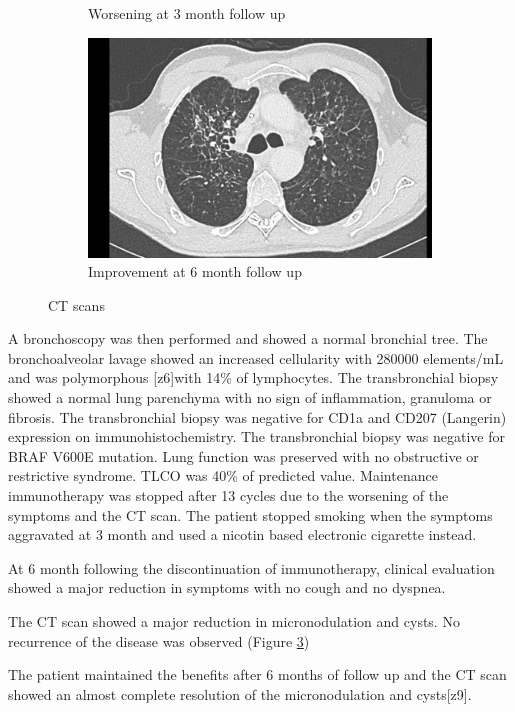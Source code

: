 \documentclass{article}
\begin{document}
\begin{figure}[ht]
\begin{subfigure}[t]{0.45\linewidth}
    \caption{Worsening at 3 month follow up}
    \label{fig:scan3}
  \end{subfigure}
  \begin{subfigure}[t]{0.45\linewidth}
    \includegraphics[width=\linewidth]{scan-m6.png}
    \caption{Improvement at 6 month follow up}
    \label{fig:scan4}
  \end{subfigure}
  \caption{CT scans}
\end{figure}
  


A bronchoscopy was then performed and showed a normal bronchial tree. The bronchoalveolar lavage showed an increased cellularity with 280000 elements/mL and was polymorphous [z6]with 14\% of lymphocytes. The transbronchial biopsy showed a normal lung parenchyma with no sign of inflammation, granuloma or fibrosis. The transbronchial biopsy was negative for CD1a and CD207 (Langerin) expression on immunohistochemistry. The transbronchial biopsy was negative for BRAF V600E mutation. 
Lung function was preserved with no obstructive or restrictive syndrome. TLCO was 40\% of predicted value. Maintenance immunotherapy was stopped after 13 cycles due to the worsening of the symptoms and the CT scan. 
The patient stopped smoking when the symptoms aggravated at 3 month and used a nicotin based electronic cigarette instead.

At 6 month following the discontinuation of immunotherapy, clinical evaluation showed a major reduction in symptoms with no cough and no dyspnea.  

The CT scan showed a major reduction in micronodulation and cysts. No recurrence of the disease was observed (Figure \ref{fig:scan4})

The patient maintained the benefits after 6 months of follow up and the CT scan showed an almost complete resolution of the micronodulation and cysts[z9].
\end{document}
